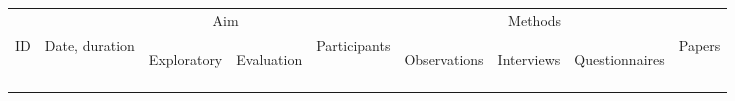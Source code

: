 \documentclass{article}[10pt]
\begin{document}
\begin{table}[h]
\begin{tabular}{@{}lllllllll}	
\toprule
   &                             & \multicolumn{2}{c}{Aim}                    &          & \multicolumn{3}{c}{Methods}            &    \\ \cline{3-4} \cline{6-8}  \noalign{\smallskip}
ID & Date, duration & \begin{turn}{90}Exploratory\end{turn} & \begin{turn}{90}Evaluation\end{turn} & Participants & \begin{turn}{90}Observations\end{turn} & \begin{turn}{90}Interviews\end{turn} & \begin{turn}{90}Questionnaires\end{turn}   & Papers \\ \midrule \noalign{\smallskip}


\end{tabular}
\end{table}
\end{document}

